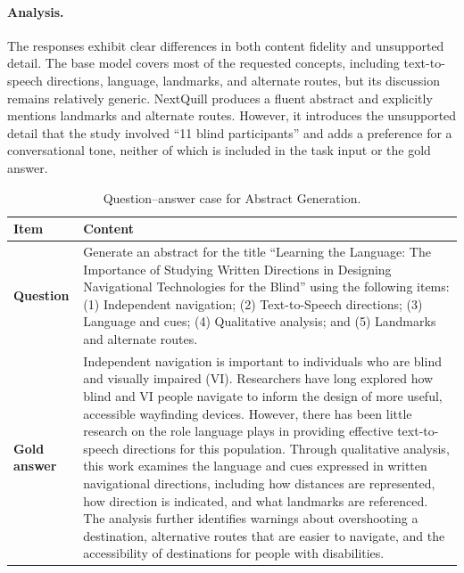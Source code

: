 \documentclass{article} %
\begin{document}
\paragraph{Analysis.}
The responses exhibit clear differences in both content fidelity and unsupported detail. The base model covers most of the requested concepts, including text-to-speech directions, language, landmarks, and alternate routes, but its discussion remains relatively generic. NextQuill produces a fluent abstract and explicitly mentions landmarks and alternate routes. However, it introduces the unsupported detail that the study involved ``11 blind participants'' and adds a preference for a conversational tone, neither of which is included in the task input or the gold answer.

\begin{table}
\centering
\small
\caption{Question--answer case for Abstract Generation.}
\label{tab:case_abstract_qa}
\begin{tabular}{p{}p{}}
\toprule
\textbf{Item} & \textbf{Content} \\
\midrule
\textbf{Question}
&
Generate an abstract for the title ``Learning the Language: The Importance of Studying Written Directions in Designing Navigational Technologies for the Blind'' using the following items: (1) Independent navigation; (2) Text-to-Speech directions; (3) Language and cues; (4) Qualitative analysis; and (5) Landmarks and alternate routes. \\[2mm]

\textbf{Gold answer}
&
Independent navigation is important to individuals who are blind and visually impaired (VI). Researchers have long explored how blind and VI people navigate to inform the design of more useful, accessible wayfinding devices. However, there has been little research on the role language plays in providing effective text-to-speech directions for this population. Through qualitative analysis, this work examines the language and cues expressed in written navigational directions, including how distances are represented, how direction is indicated, and what landmarks are referenced. The analysis further identifies warnings about overshooting a destination, alternative routes that are easier to navigate, and the accessibility of destinations for people with disabilities. \\
\bottomrule
\end{tabular}
\end{table}
\end{document}
